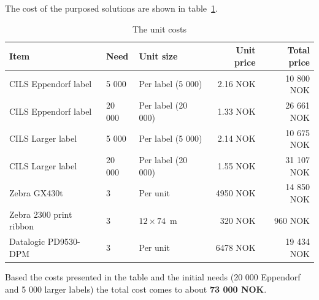 \documentclass[a4paper,english, 11pt]{article}
\begin{document}
The cost of the purposed solutions are shown in table~\ref{tab:costs}.
\begin{table}[htb]
    
    \caption{\label{tab:costs}The unit costs}
    \begin{tabular}{lllrr}
        \hline
        \textbf{Item} & Need & \textbf{Unit size} & \textbf{Unit price} & \textbf{Total price} \\
        \hline
        CILS Eppendorf label    & 5 000     & Per label  (5 000)    & 2.16 NOK  & 10 800 NOK\\ 
        CILS Eppendorf label    & 20 000    & Per label  (20 000)   & 1.33 NOK  & 26 661 NOK\\ 
        CILS Larger label       & 5 000     & Per label  (5 000)    & 2.14 NOK  & 10 675 NOK\\ 
        CILS Larger label       & 20 000    & Per label  (20 000)   & 1.55 NOK  & 31 107 NOK\\ 
        Zebra GX430t            & 3         & Per unit              & 4950 NOK  & 14 850 NOK\\ 
        Zebra 2300 print ribbon & 3         & $12\times74$~m         & 320 NOK   & 960 NOK\\ 
        Datalogic PD9530-DPM    & 3         & Per unit              & 6478 NOK  & 19 434 NOK\\ 
        \hline
    \end{tabular}
\end{table}


Based the costs presented in the table and the initial needs (20 000 Eppendorf and 5 000 larger labels) the total cost comes to about \textbf{73 000 NOK}.
\end{document}
